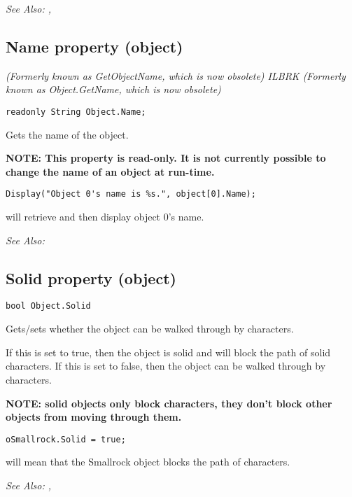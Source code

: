\it{See Also:} ,


\subsection{Name property (object)}\label{Object.Name}%

\it{(Formerly known as GetObjectName, which is now obsolete)} ILBRK
\it{(Formerly known as Object.GetName, which is now obsolete)}

\begin{verbatim}
readonly String Object.Name;
\end{verbatim}
Gets the name of the object.

\bf{NOTE}: This property is read-only. It is not currently possible to change the name
of an object at run-time.

\begin{verbatim}
Display("Object 0's name is %s.", object[0].Name);
\end{verbatim}
will retrieve and then display object 0's name.

\it{See Also:} 


\subsection{Solid property (object)}\label{Object.Solid}%

\begin{verbatim}
bool Object.Solid
\end{verbatim}
Gets/sets whether the object can be walked through by characters.

If this is set to true, then the object is solid and will block the path of solid
characters. If this is set to false, then the object can be walked through by
characters.

\bf{NOTE:} solid objects only block characters, they don't block other objects from
moving through them.

\begin{verbatim}
oSmallrock.Solid = true;
\end{verbatim}
will mean that the Smallrock object blocks the path of characters.

\it{See Also:} ,


